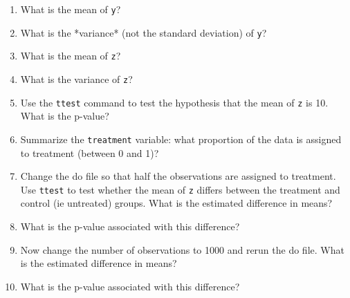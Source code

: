 \documentclass[11pt]{article}
\begin{document}
\begin{enumerate}
	
\item What is the mean of \texttt{y}?

\item What is the *variance* (not the standard deviation) of \texttt{y}?

\item What is the mean of \texttt{z}?

\item What is the variance of \texttt{z}?

\item Use the \texttt{ttest} command to test the hypothesis that the mean of \texttt{z} is 10.  What is the p-value?

\item Summarize the \texttt{treatment} variable:  what proportion of the data is assigned to treatment (between 0 and 1)?

\item Change the do file so that half the observations are assigned to treatment. Use \texttt{ttest} to test whether the mean of \texttt{z} differs between the treatment and control (ie untreated) groups.  What is the estimated difference in means?

\item What is the p-value associated with this difference?

\item Now change the number of observations to 1000 and rerun the do file.  What is the estimated difference in means?

\item What is the p-value associated with this difference?


\end{enumerate}
\end{document}
